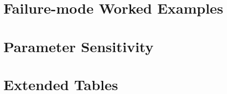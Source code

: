\documentclass[11pt,a4paper]{article}
\begin{document}
\section{Failure-mode Worked Examples}


\section{Parameter Sensitivity}

%

\section{Extended Tables}




\end{document}
